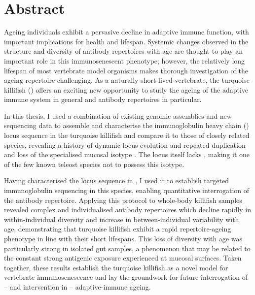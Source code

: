 {
\cleardoublepage
\setsinglecolumn
\chapter*{\centering \LARGE Abstract}
\thispagestyle{empty}

Ageing individuals exhibit a pervasive decline in adaptive immune function, with important implications for health and lifespan. Systemic changes observed in the structure and diversity of antibody repertoires with age are thought to play an important role in this immunosenescent phenotype; however, the relatively long lifespan of most vertebrate model organisms makes thorough investigation of the ageing repertoire challenging. As a naturally short-lived vertebrate, the turquoise killifish (\nfu) offers an exciting new opportunity to study the ageing of the adaptive immune system in general and antibody repertoires in particular.

In this thesis, I used a combination of existing genomic assemblies and new sequencing data to assemble and characterise the immunoglobulin heavy chain (\igh{}) locus sequence in the turquoise killifish and compare it to those of closely related species, revealing a history of dynamic locus evolution and repeated duplication and loss of the specialised mucosal isotype . The \Nfu locus itself lacks , making it one of the few known teleost species not to possess this isotype. 

Having characterised the \igh{} locus sequence in \Nfu, I used it to establish targeted immunoglobulin sequencing in this species, enabling quantitative interrogation of the antibody repertoire. Applying this protocol to whole-body killifish samples revealed complex and individualised antibody repertoires which decline rapidly in within-individual diversity and increase in between-individual variability with age, demonstrating that turquoise killifish exhibit a rapid repertoire-ageing phenotype in line with their short lifespans. This loss of diversity with age was particularly strong in isolated gut samples, a phenomenon that may be related to the constant strong antigenic exposure experienced at mucosal surfaces. Taken together, these results establish the turquoise killifish as a novel model for vertebrate immunosenescence and lay the groundwork for future interrogation of -- and intervention in -- adaptive-immune ageing.
}
